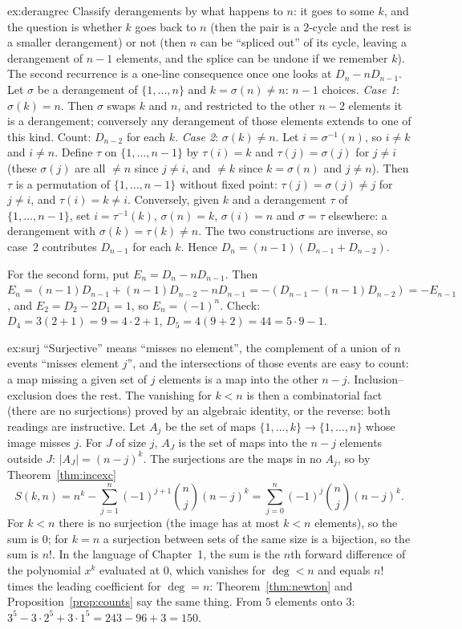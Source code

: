 \begin{solution}{ex:derangrec}
\idea Classify derangements by what happens to $n$: it goes to some $k$, and the question is whether $k$ goes back to $n$ (then the pair is a $2$-cycle and the rest is a smaller derangement) or not (then $n$ can be ``spliced out'' of its cycle, leaving a derangement of $n-1$ elements, and the splice can be undone if we remember $k$). The second recurrence is a one-line consequence once one looks at $D_n-nD_{n-1}$.
\writeup Let $\sigma$ be a derangement of $\{1,\dots,n\}$ and $k=\sigma(n)\ne n$: $n-1$ choices. \emph{Case 1}: $\sigma(k)=n$. Then $\sigma$ swaps $k$ and $n$, and restricted to the other $n-2$ elements it is a derangement; conversely any derangement of those elements extends to one of this kind. Count: $D_{n-2}$ for each $k$. \emph{Case 2}: $\sigma(k)\ne n$. Let $i=\sigma^{-1}(n)$, so $i\ne k$ and $i\ne n$. Define $\tau$ on $\{1,\dots,n-1\}$ by $\tau(i)=k$ and $\tau(j)=\sigma(j)$ for $j\ne i$ (these $\sigma(j)$ are all $\ne n$ since $j\ne i$, and $\ne k$ since $k=\sigma(n)$ and $j\ne n$). Then $\tau$ is a permutation of $\{1,\dots,n-1\}$ without fixed point: $\tau(j)=\sigma(j)\ne j$ for $j\ne i$, and $\tau(i)=k\ne i$. Conversely, given $k$ and a derangement $\tau$ of $\{1,\dots,n-1\}$, set $i=\tau^{-1}(k)$, $\sigma(n)=k$, $\sigma(i)=n$ and $\sigma=\tau$ elsewhere: a derangement with $\sigma(k)=\tau(k)\ne n$. The two constructions are inverse, so case~2 contributes $D_{n-1}$ for each $k$. Hence $D_n=(n-1)(D_{n-1}+D_{n-2})$.

For the second form, put $E_n=D_n-nD_{n-1}$. Then $E_n=(n-1)D_{n-1}+(n-1)D_{n-2}-nD_{n-1}=-(D_{n-1}-(n-1)D_{n-2})=-E_{n-1}$, and $E_2=D_2-2D_1=1$, so $E_n=(-1)^n$. Check: $D_4=3(2+1)=9=4\cdot2+1$, $D_5=4(9+2)=44=5\cdot9-1$.
\end{solution}

\begin{solution}{ex:surj}
\idea ``Surjective'' means ``misses no element'', the complement of a union of $n$ events ``misses element $j$'', and the intersections of those events are easy to count: a map missing a given set of $j$ elements is a map into the other $n-j$. Inclusion--exclusion does the rest. The vanishing for $k<n$ is then a combinatorial fact (there are no surjections) proved by an algebraic identity, or the reverse: both readings are instructive.
\writeup Let $A_j$ be the set of maps $\{1,\dots,k\}\to\{1,\dots,n\}$ whose image misses $j$. For $J$ of size $j$, $A_J$ is the set of maps into the $n-j$ elements outside $J$: $|A_J|=(n-j)^k$. The surjections are the maps in no $A_j$, so by Theorem~\ref{thm:incexc}
\[
S(k,n)=n^k-\sum_{j=1}^n(-1)^{j+1}\binom nj(n-j)^k=\sum_{j=0}^n(-1)^j\binom nj(n-j)^k .
\]
For $k<n$ there is no surjection (the image has at most $k<n$ elements), so the sum is $0$; for $k=n$ a surjection between sets of the same size is a bijection, so the sum is $n!$. In the language of Chapter~1, the sum is the $n$th forward difference of the polynomial $x^k$ evaluated at $0$, which vanishes for $\deg<n$ and equals $n!$ times the leading coefficient for $\deg=n$: Theorem~\ref{thm:newton} and Proposition~\ref{prop:counts} say the same thing. From $5$ elements onto $3$: $3^5-3\cdot2^5+3\cdot1^5=243-96+3=150$.
\end{solution}

